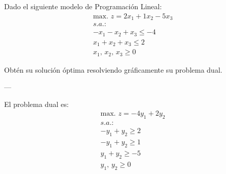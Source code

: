 Dado el siguiente modelo de Programación Lineal:
\begin{equation}
\begin{split}
\mbox{max. } z = 2x_1 + 1x_2 -5 x_3\\
s.a.:\\
-x_1 -x_2 + x_3 \leq -4\\
x_1 +  x_2 +  x_3 \leq 2\\
x_1,\,x_2,\,x_3 \geq 0
\end{split}
\end{equation}

Obtén su solución óptima resolviendo gráficamente su problema dual.

---

El problema dual es:
\begin{equation}
\begin{split}
\mbox{max. } z = -4y_1+2y_2\\
s.a.:\\
-y_1 + y_2 \geq 2\\
-y_1 + y_2 \geq 1\\
y_1+y_2 \geq -5\\
y_1,\, y_2\geq 0
\end{split}
\end{equation}

